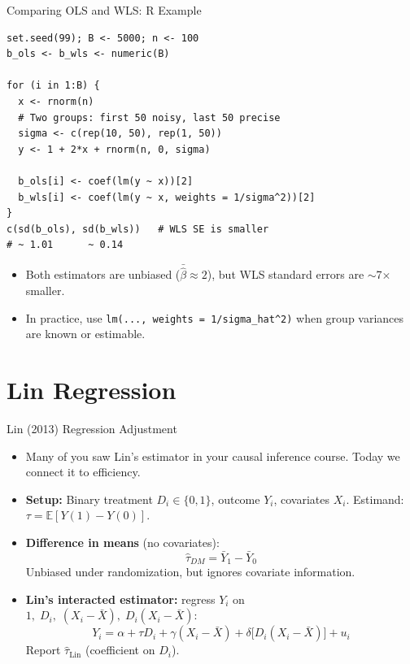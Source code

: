 \documentclass[aspectratio=169, handout]{beamer}
\numberwithin{equation}{section}
\begin{document}
\begin{frame}[fragile]{Comparing OLS and WLS: R Example}
\begin{lstlisting}[basicstyle=\ttfamily\scriptsize]
set.seed(99); B <- 5000; n <- 100
b_ols <- b_wls <- numeric(B)

for (i in 1:B) {
  x <- rnorm(n)
  # Two groups: first 50 noisy, last 50 precise
  sigma <- c(rep(10, 50), rep(1, 50))
  y <- 1 + 2*x + rnorm(n, 0, sigma)

  b_ols[i] <- coef(lm(y ~ x))[2]
  b_wls[i] <- coef(lm(y ~ x, weights = 1/sigma^2))[2]
}
c(sd(b_ols), sd(b_wls))   # WLS SE is smaller
# ~ 1.01      ~ 0.14
\end{lstlisting}
\vspace{0.3em}
\begin{itemize}
\item Both estimators are unbiased ($\bar{\hat{\beta}}\approx 2$), but WLS standard errors are $\sim$7$\times$ smaller.
\item In practice, use \texttt{lm(..., weights = 1/sigma\_hat\^{}2)} when group variances are known or estimable.
\end{itemize}
\end{frame}

\section{Lin Regression}

\begin{frame}{Lin (2013) Regression Adjustment}
\begin{itemize}
\item Many of you saw Lin's estimator in your causal inference course.  Today we connect it to efficiency.\pause
\item \textbf{Setup:} Binary treatment $D_i\in\{0,1\}$, outcome $Y_i$, covariates $X_i$.  Estimand: $\tau=\mathbb{E}[Y(1)-Y(0)]$.\pause
\item \textbf{Difference in means} (no covariates):
$$\hat{\tau}_{DM}=\bar{Y}_1-\bar{Y}_0$$
Unbiased under randomization, but ignores covariate information.\pause
\item \textbf{Lin's interacted estimator:} regress $Y_i$ on $1,\; D_i,\; (X_i-\bar{X}),\; D_i(X_i-\bar{X})$:
$$Y_i=\alpha+\tau D_i+\gamma(X_i-\bar{X})+\delta\big[D_i(X_i-\bar{X})\big]+u_i$$
Report $\hat{\tau}_{\text{Lin}}$ (coefficient on $D_i$).
\end{itemize}
\end{frame}
\end{document}
